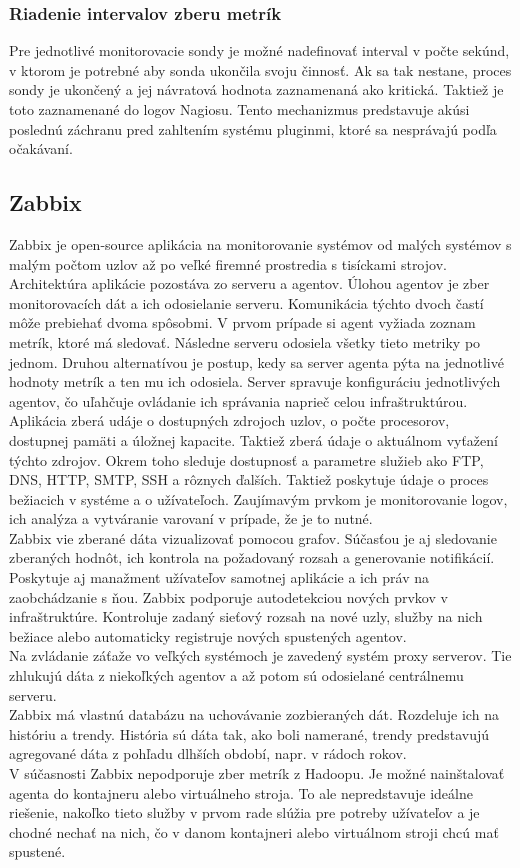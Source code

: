\documentclass[11pt,final,oneside]{fithesis}
\begin{document}
\subsubsection{Riadenie intervalov zberu metrík}
Pre jednotlivé monitorovacie sondy je možné nadefinovať interval v počte sekúnd, v ktorom je potrebné aby sonda ukončila svoju činnosť. Ak sa tak nestane, proces sondy je ukončený a jej návratová hodnota
zaznamenaná ako kritická. Taktiež je toto zaznamenané do logov Nagiosu. Tento mechanizmus predstavuje akúsi poslednú záchranu pred zahltením systému pluginmi, ktoré sa nesprávajú podľa očakávaní.

\subsection{Zabbix}
Zabbix je open-source aplikácia na monitorovanie systémov od malých systémov s malým počtom uzlov až po veľké firemné prostredia s tisíckami strojov. Architektúra aplikácie pozostáva zo serveru a agentov.
Úlohou agentov je zber monitorovacích dát a ich odosielanie serveru. Komunikácia týchto dvoch častí môže prebiehať dvoma spôsobmi. V prvom prípade si agent vyžiada zoznam metrík, ktoré má sledovať. Následne 
serveru odosiela všetky tieto metriky po jednom. Druhou alternatívou je postup, kedy sa server agenta pýta na jednotlivé hodnoty metrík a ten mu ich odosiela. Server spravuje konfiguráciu jednotlivých agentov,
čo uľahčuje ovládanie ich správania naprieč celou infraštruktúrou.
\\Aplikácia zberá udáje o dostupných zdrojoch uzlov, o počte procesorov, dostupnej pamäti a úložnej kapacite. Taktiež zberá údaje o aktuálnom vyťažení týchto zdrojov. Okrem toho sleduje dostupnosť a parametre
služieb ako FTP, DNS, HTTP, SMTP, SSH a rôznych ďalších. Taktiež poskytuje údaje o proces bežiacich v systéme a o užívateľoch. Zaujímavým prvkom je monitorovanie logov, ich analýza a vytváranie varovaní 
v prípade, že je to nutné.
\\Zabbix vie zberané dáta vizualizovať pomocou grafov. Súčasťou je aj sledovanie zberaných hodnôt, ich kontrola na požadovaný rozsah a generovanie notifikácií. Poskytuje aj manažment užívateľov samotnej 
aplikácie a ich práv na zaobchádzanie s ňou. Zabbix podporuje autodetekciou nových prvkov v infraštruktúre. Kontroluje zadaný sieťový rozsah na nové uzly, služby na nich bežiace alebo automaticky registruje
nových spustených agentov.
\\Na zvládanie záťaže vo veľkých systémoch je zavedený systém proxy serverov. Tie zhlukujú dáta z niekoľkých agentov a až potom sú odosielané centrálnemu serveru.
\\Zabbix má vlastnú databázu na uchovávanie zozbieraných dát. Rozdeluje ich na históriu a trendy. História sú dáta tak, ako boli namerané, trendy predstavujú agregované dáta z pohľadu dlhších období, napr. v 
rádoch rokov.
\\V súčasnosti Zabbix nepodporuje zber metrík z Hadoopu. Je možné nainštalovať agenta do kontajneru alebo virtuálneho stroja. To ale nepredstavuje ideálne riešenie, nakoľko tieto služby v prvom rade
slúžia pre potreby užívateľov a je chodné nechať na nich, čo v danom kontajneri alebo virtuálnom stroji chcú mať spustené.
\end{document}
